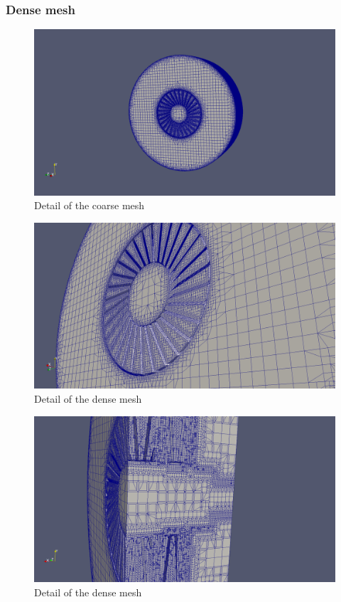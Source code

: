 \subsubsection{Dense mesh}

\begin{figure}[h!]
\includegraphics[scale=0.26]{./mesh/screenshots/Xtreme1}
\centering
\caption{Detail of the coarse mesh}
\end{figure}

\begin{figure}[h!]
\includegraphics[scale=0.26]{./mesh/screenshots/Xtreme3}
\centering
\caption{Detail of the dense mesh}
\end{figure}

\begin{figure}[h!]
\includegraphics[scale=0.26]{./mesh/screenshots/Xtreme5}
\centering
\caption{Detail of the dense mesh}
\end{figure}
